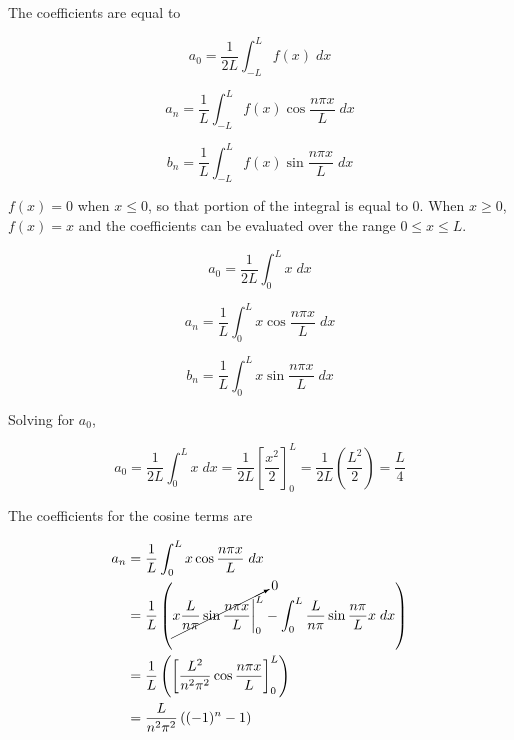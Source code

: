 The coefficients are equal to

\begin{equation}
 a_0 = \frac{1}{2 L } \int_{-L}^{L} f(x) \; dx 
\end{equation}


\begin{equation}
 a_n = \frac{1}{L} \int_{-L}^{L} f(x) \cos{\frac{n \pi x}{L}} \; dx 
\end{equation}

\begin{equation}
 b_n = \frac{1}{L} \int_{-L}^{L} f(x) \sin{\frac{n \pi x}{L}} \; dx 
\end{equation}

\(f(x)=0\) when \(x \leq 0\), so that portion of the integral is equal to 0. When \(x \geq 0\), \(f(x)=x\) and the coefficients can be evaluated over the range \(0 \leq x \leq L\).

\begin{equation}
 a_0 = \frac{1}{2 L } \int_{0}^{L} x \; dx 
\end{equation}


\begin{equation}
 a_n = \frac{1}{L} \int_{0}^{L} x \cos{\frac{n \pi x}{L}} \; dx 
\end{equation}

\begin{equation}
 b_n = \frac{1}{L} \int_{0}^{L} x \sin{\frac{n \pi x}{L}} \; dx 
\end{equation}


Solving for \(a_0\), 

\begin{equation}
 a_0 = \frac{1}{2 L } \int_{0}^{L} x \; dx = \frac{1}{2 L} \left[ \frac{x^2}{2} \right]^{L}_{0} = \frac{1}{2 L} \left(\frac{L^2}{2} \right) = \frac{L}{4}
\end{equation}

The coefficients for the cosine terms are 

\begin{equation}
 \begin{split} 
     a_n &= \frac{1}{L} \int_{0}^{L} x \cos{\frac{n \pi x}{L}} \; dx \\ 
         &=  \frac{1}{L} \left(\cancelto{0}{x \frac{L}{n \pi}   \sin{\frac{n \pi x}{L}}  \bigg|^{L}_0}  - \int_0^L \frac{L}{n \pi} \sin{\frac{n \pi}{L} x} \; dx  \right) \\
         &= \frac{1}{L} \left( \left[ \frac{L^2}{n^2 \pi^2} \cos{\frac{n \pi x}{L}}  \right]^L_0 \right) \\
         &= \frac{L}{n^2 \pi^2}\left( (-1)^n - 1 \right)
 \end{split}
\end{equation}


